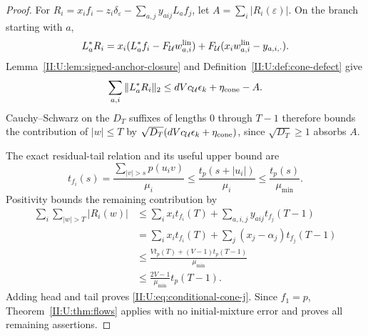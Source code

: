\begin{proof}
For $R_i=x_if_i-z_i\delta_\varepsilon-\sum_{a,j}y_{aij}L_af_j$,
let $A=\sum_i|R_i(\varepsilon)|$. On the branch starting with $a$,
\[
 L_a^*R_i=x_i(L_a^*f_i-F_{\mathcal U}w_{a,i}^{\rm lin})
           +F_{\mathcal U}(x_iw_{a,i}^{\rm lin}-y_{a,i,\cdot}).
\]
Lemma~\ref{II:U:lem:signed-anchor-closure} and
Definition~\ref{II:U:def:cone-defect} give
\[
 \sum_{a,i}\|L_a^*R_i\|_2
 \le dV c_{\mathcal U}\epsilon_k+\eta_{\rm cone}-A.
\]
Cauchy--Schwarz on the $D_T$ suffixes of lengths $0$ through $T-1$
therefore bounds the contribution of $|w|\le T$ by
$\sqrt{D_T}(dV c_{\mathcal U}\epsilon_k+\eta_{\rm cone})$,
since $\sqrt{D_T}\ge1$ absorbs $A$.

The exact residual-tail relation and its useful upper bound are
\begin{equation}
 t_{f_i}(s)=\frac{\sum_{|v|>s}p(u_iv)}{\mu_i}
 \le\frac{t_p(s+|u_i|)}{\mu_i}
 \le\frac{t_p(s)}{\mu_{\min}}.
 \label{II:U:eq:conditional-anchor-tail}
\end{equation}
Positivity bounds the remaining contribution by
\begin{align*}
 \sum_i\sum_{|w|>T}|R_i(w)|
 &\le\sum_i x_it_{f_i}(T)
           +\sum_{a,i,j}y_{aij}t_{f_j}(T-1)\\
 &=\sum_i x_it_{f_i}(T)
           +\sum_j(x_j-\alpha_j)t_{f_j}(T-1)\\
 &\le\frac{Vt_p(T)+(V-1)t_p(T-1)}{\mu_{\min}}\\
 &\le\frac{2V-1}{\mu_{\min}}t_p(T-1).
\end{align*}
Adding head and tail proves \eqref{II:U:eq:conditional-cone-j}.
Since $f_1=p$, Theorem~\ref{II:U:thm:flows} applies with no initial-mixture
error and proves all remaining assertions.
\end{proof}
